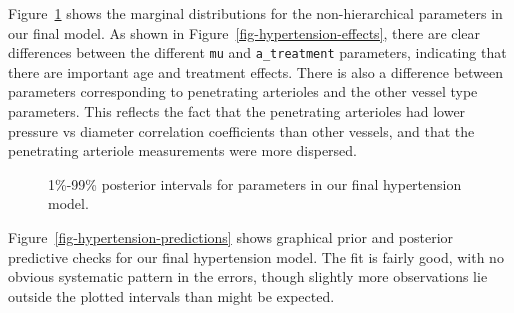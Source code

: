 \documentclass[
  letterpaper,
  DIV=11,
  numbers=noendperiod,
  oneside]{scrartcl}
\theoremstyle{plain}
\theoremstyle{remark}
\begin{document}
Figure~\ref{fig-hypertension-parameters} shows the marginal
distributions for the non-hierarchical parameters in our final model. As
shown in Figure~\ref{fig-hypertension-effects}, there are clear
differences between the different \texttt{mu} and \texttt{a\_treatment}
parameters, indicating that there are important age and treatment
effects. There is also a difference between parameters corresponding to
penetrating arterioles and the other vessel type parameters. This
reflects the fact that the penetrating arterioles had lower pressure vs
diameter correlation coefficients than other vessels, and that the
penetrating arteriole measurements were more dispersed.

\begin{figure}


\caption{\label{fig-hypertension-parameters}1\%-99\% posterior intervals
for parameters in our final hypertension model.}

\end{figure}%

Figure~\ref{fig-hypertension-predictions} shows graphical prior and
posterior predictive checks for our final hypertension model. The fit is
fairly good, with no obvious systematic pattern in the errors, though
slightly more observations lie outside the plotted intervals than might
be expected.
\end{document}
